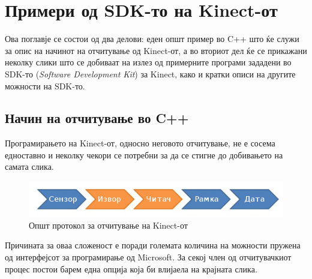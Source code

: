 \documentclass[11pt]{article}
\begin{document}
\section{Примери од SDK-то на Kinect-от} \label{sec:example}
  Ова поглавје се состои од два делови: еден општ пример во C++ што ќе служи за опис на начинот на отчитување од Kinect-от, а во вториот дел ќе се прикажани неколку слики што се добиваат на излез од примерните програми зададени во SDK-то (\textit{Software Development Kit}) за Kinect, како и кратки описи на другите можности на SDK-то.

  \subsection{Начин на отчитување во C++}
    Програмирањето на Kinect-от, односно неговото отчитување, не е сосема едноставно и неколку чекори се потребни за да се стигне до добивањето на самата слика.

    \begin{figure}[H]
      \includegraphics[width=0.75\linewidth]{./images/programming_flow_trimmed.png}
      \centering
      \caption{Општ протокол за отчитување на Kinect-от}
      \label{fig:programming_flow_trimmed.png}
      \end{figure}

    Причината за оваа сложеност е поради големата количина на можности пружена од интерфејсот за програмирање од Microsoft. За секој член од отчитувачкиот процес постои барем една опција која би влијаела на крајната слика.
\end{document}
